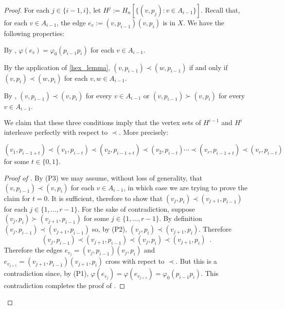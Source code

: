 \documentclass[kpfonts]{patmorin}
\begin{document}
\begin{proof}
    For each $j\in\{i-1,i\}$, let $H^j:=H_n[\{(v,p_j):v\in A_{i-1}\}]$. 
    Recall that, for each $v\in A_{i-1}$, the edge $e_v:=(v,p_{i-1})(v,p_i)$ is in $X$.  We have the following properties:
    \begin{compactenum}[(P1)]
        \item By , $\varphi(e_v)=\varphi_0(p_{i-1}p_i)$ for each $v\in A_{i-1}$.
        \item By the application of \cref{hex_lemma}, $(v,p_{i-1})\prec (w,p_{i-1})$ if and only if $(v,p_{i})\prec (w,p_{i})$ for each $v,w\in A_{i-1}$.
        \item By , $(v,p_{i-1})\prec (v,p_i)$ for every $v\in A_{i-1}$ or $(v,p_{i-1})\succ (v,p_i)$ for every $v\in A_{i-1}$.
    \end{compactenum}
    We claim that these three conditions imply that the vertex sets of $H^{i-1}$ and $H^{i}$ interleave perfectly with respect to $\prec$. More precisely:
	\begin{clm} $(v_1,p_{i-1+t})\prec (v_1,p_{i-t}) \prec (v_2,p_{i-1+t}) \prec (v_2,p_{i-t}) \cdots \prec (v_r,p_{i-1+t}) \prec (v_r,p_{i-t})$ for some $t\in\{0,1\}$.
	\end{clm}
	\begin{proof}[Proof of ]
		By (P3) we may assume, without loss of generality, that $(v,p_{i-1})\prec (v,p_i)$ for each $v\in A_{i-1}$, in which case we are trying to prove the claim for $t=0$.  It is sufficient, therefore to show that $(v_j,p_i)\prec (v_{j+1},p_{i-1})$ for each $j\in\{1,\ldots,r-1\}$.  For the sake of contradiction, suppose $(v_j,p_{i})\succ (v_{j+1},p_{i-1})$ for some $j\in\{1,\ldots,r-1\}$. By definition  $(v_j,p_{i-1})\prec (v_{j+1},p_{i-1})$ so, by (P2),  $(v_{j},p_i) \prec (v_{j+1},p_i)$.  Therefore
		\[
			(v_j,p_{i-1})\prec (v_{j+1},p_{i-1})\prec(v_{j},p_i) \prec
		   (v_{j+1}, p_i) \enspace .
	   	\]
		Therefore the edges $e_{v_j}=(v_j,p_{i-1})(v_j,p_{i})$ and $e_{v_{j+1}}=(v_{j+1},p_{i-1})(v_{j+1},p_i)$ cross with repect to $\prec$.  But this is a contradiction since, by (P1),  $\varphi(e_{v_j}) =\varphi(e_{v_{j+1}})=\varphi_0(p_{i-1}p_i)$.
		This contradiction completes the proof of .
	\end{proof}


\end{proof}
\end{document}
